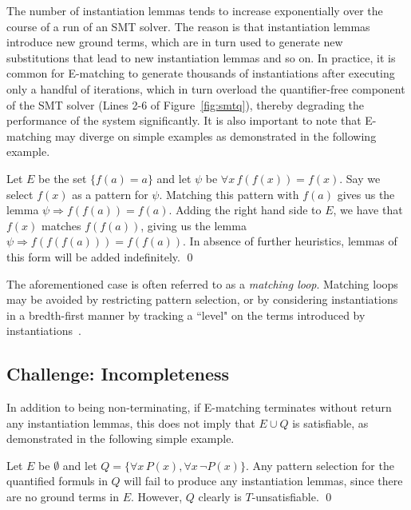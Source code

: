 \documentclass[oribibl]{llncs}
\begin{document}
The number of instantiation lemmas tends to increase exponentially over the course of a run of an SMT solver.
The reason is that instantiation lemmas introduce new ground terms, which are in turn used to generate new substitutions that lead to
new instantiation lemmas and so on.
In practice, it is common for E-matching to generate thousands of instantiations after executing only a handful of iterations,
which in turn overload the quantifier-free component of the SMT solver (Lines 2-6 of Figure~\ref{fig:smtq}),
thereby degrading the performance of the system significantly.
It is also important to note that E-matching may diverge on simple examples
as demonstrated in the following example.

\begin{example}
Let $E$ be the set $\{ f( a ) = a \}$ and let $\psi$ be $\forall x\, f( f( x ) ) = f( x )$.
Say we select $f( x )$ as a pattern for $\psi$.
Matching this pattern with $f( a )$ gives us the lemma $\psi \Rightarrow f( f( a ) ) = f( a )$.
Adding the right hand side to $E$, we have that $f( x )$ matches $f( f( a ) )$, giving us the lemma $\psi \Rightarrow f( f( f( a ) ) ) = f( f( a ) )$.
In absence of further heuristics, lemmas of this form will be added indefinitely.
\qed
\end{example}

The aforementioned case is often referred to as a \emph{matching loop}.
Matching loops may be avoided by
restricting pattern selection, or by
considering instantiations in a bredth-first manner by tracking a ``level" on the terms introduced by instantiations~\cite{GeBarrettTinelli07}.

\subsection{Challenge: Incompleteness}

In addition to being non-terminating, if E-matching terminates without return any instantiation lemmas,
this does not imply that $E \cup Q$ is satisfiable, as demonstrated in the following simple example.

\begin{example}
Let $E$ be $\emptyset$ and let $Q = \{ \forall x\, P( x ), \forall x\, \neg P( x ) \}$.
Any pattern selection for the quantified formuls in $Q$ will fail to produce any instantiation lemmas,
since there are no ground terms in $E$.
However, $Q$ clearly is $T$-unsatisfiable.
\qed
\end{example}
\end{document}

